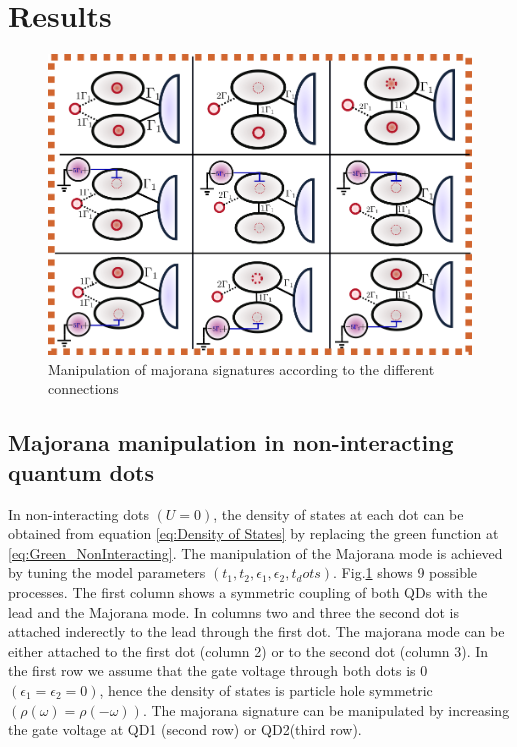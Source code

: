 \documentclass[showpacs,aps,prb,reprint,superscriptaddress]{revtex4-1}
\begin{document}
 \section{Results}
\begin{figure}[bt]
\begin{center}
\includegraphics[scale=0.27]{Graficos/MajoranaModels.png}
\caption{\label{fig:MajoranaModels}  Manipulation of majorana signatures according to the different connections
}
%
\end{center}
\end{figure}

     \subsection{Majorana manipulation in non-interacting quantum dots}
     In non-interacting dots $(U=0)$, the density of states at each dot can be obtained from equation \eqref{eq:Density of States} by replacing the green function at \eqref{eq:Green_NonInteracting}. The manipulation of the Majorana mode is achieved by  tuning the model parameters $(t_1,t_2, \epsilon_1 , \epsilon_2 , t_dots)$. Fig.\ref{fig:MajoranaModels} shows 9 possible processes. The first column shows a symmetric coupling of both QDs with the lead and the Majorana mode. In columns two and three the second dot is attached inderectly to the lead through the first dot. The majorana mode can be either attached to the first dot (column 2) or to the second dot (column 3). In the first row we assume that the gate voltage through both dots is $0$ $(\epsilon_1 = \epsilon_2 = 0)$, hence the density of states is particle hole symmetric $(\rho(\omega) = \rho(-\omega))$. The majorana signature can be manipulated by increasing the gate voltage at QD1 (second row) or QD2(third row). 
     
\end{document}
